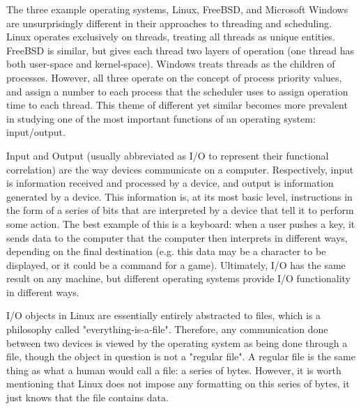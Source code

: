 \documentclass[10pt,draftclsnofoot,onecolumn]{IEEEtran}
\begin{document}
    The three example operating systems, Linux, FreeBSD, and Microsoft Windows are unsurprisingly different in their approaches to threading and scheduling. Linux operates exclusively on threads, treating all threads as unique entities. FreeBSD is similar, but gives each thread two layers of operation (one thread has both user-space and kernel-space). Windows treats threads as the children of processes. However, all three operate on the concept of process priority values, and assign a number to each process that the scheduler uses to assign operation time to each thread. This theme of different yet similar becomes more prevalent in studying one of the most important functions of an operating system: input/output.\par
        
    Input and Output (usually abbreviated as I/O to represent their functional correlation) are the way devices communicate on a computer. Respectively, input is information received and processed by a device, and output is information generated by a device. This information is, at its most basic level, instructions in the form of a series of bits that are interpreted by a device that tell it to perform some action. The best example of this is a keyboard: when a user pushes a key, it sends data to the computer that the computer then interprets in different ways, depending on the final destination (e.g. this data may be a character to be displayed, or it could be a command for a game). Ultimately, I/O has the same result on any machine, but different operating systems provide I/O functionality in different ways.\par
    I/O objects in Linux are essentially entirely abstracted to files, which is a philosophy called "everything-is-a-file". Therefore, any communication done between two devices is viewed by the operating system as being done through a file, though the object in question is not a "regular file". A regular file is the same thing as what a human would call a file: a series of bytes. However, it is worth mentioning that Linux does not impose any formatting on this series of bytes, it just knows that the file contains data.\par
\end{document}
